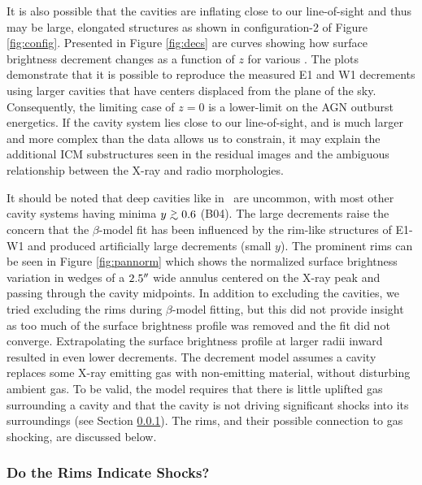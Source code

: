 \documentclass[iop]{emulateapj}
\begin{document}
It is also possible that the cavities are inflating close to our
line-of-sight and thus may be large, elongated structures as shown in
configuration-2 of Figure \ref{fig:config}. Presented in Figure
\ref{fig:decs} are curves showing how surface brightness decrement
changes as a function of $z$ for various \rlos. The plots demonstrate
that it is possible to reproduce the measured E1 and W1 decrements
using larger cavities that have centers displaced from the plane of
the sky. Consequently, the limiting case of $z = 0$ is a lower-limit
on the AGN outburst energetics. If the cavity system lies close to our
line-of-sight, and is much larger and more complex than the data
allows us to constrain, it may explain the additional ICM
substructures seen in the residual images and the ambiguous
relationship between the X-ray and radio morphologies.

It should be noted that deep cavities like in \rbs\ are uncommon, with
most other cavity systems having minima $y \ga 0.6$ (B04). The large
decrements raise the concern that the $\beta$-model fit has been
influenced by the rim-like structures of E1-W1 and produced
artificially large decrements (small $y$). The prominent rims can be
seen in Figure \ref{fig:pannorm} which shows the normalized surface
brightness variation in wedges of a $2.5\rm{^\prime}\hskip -0.1em\rm{^\prime}$ wide annulus centered
on the X-ray peak and passing through the cavity midpoints. In
addition to excluding the cavities, we tried excluding the rims during
$\beta$-model fitting, but this did not provide insight as too much of
the surface brightness profile was removed and the fit did not
converge. Extrapolating the surface brightness profile at larger radii
inward resulted in even lower decrements. The \citet{hydraa} decrement
model assumes a cavity replaces some X-ray emitting gas with
non-emitting material, without disturbing ambient gas. To be valid,
the model requires that there is little uplifted gas surrounding a
cavity \citep[\cf][]{2005ApJ...628..629N, 2001ApJ...558L..15B} and
that the cavity is not driving significant shocks into its
surroundings (see Section \ref{sec:shocks}). The rims, and their
possible connection to gas shocking, are discussed below.

\subsubsection{Do the Rims Indicate Shocks?}
\label{sec:shocks}
\end{document}
